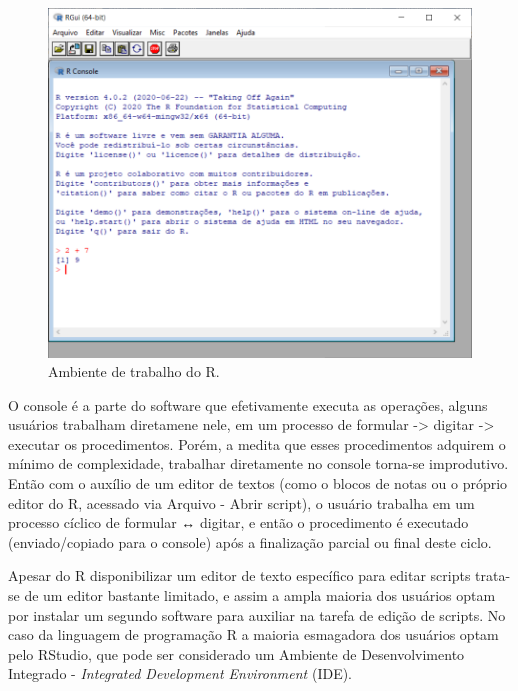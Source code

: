 \documentclass[
  11pt,
  a5paper,
  openany]{book}
\begin{document}
\begin{figure}

{\centering \includegraphics[width=1\linewidth]{images/Fig_R_padrao} 

}

\caption{Ambiente de trabalho do R.}\label{fig:FigRpadrao}
\end{figure}

O console é a parte do software que efetivamente executa as operações, alguns usuários trabalham diretamene nele, em um processo de formular -\textgreater{} digitar -\textgreater{} executar os procedimentos. Porém, a medita que esses procedimentos adquirem o mínimo de complexidade, trabalhar diretamente no console torna-se improdutivo. Então com o auxílio de um editor de textos (como o blocos de notas ou o próprio editor do R, acessado via Arquivo - Abrir script), o usuário trabalha em um processo cíclico de formular ↔ digitar, e então o procedimento é executado (enviado/copiado para o console) após a finalização parcial ou final deste ciclo.

Apesar do R disponibilizar um editor de texto específico para editar scripts trata-se de um editor bastante limitado, e assim a ampla maioria dos usuários optam por instalar um segundo software para auxiliar na tarefa de edição de scripts. No caso da linguagem de programação R a maioria esmagadora dos usuários optam pelo RStudio, que pode ser considerado um Ambiente de Desenvolvimento Integrado - \emph{Integrated Development Environment} (IDE).
\end{document}
